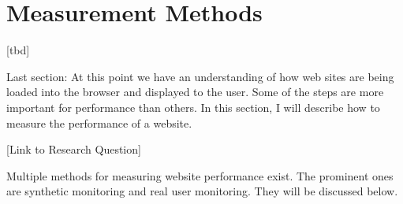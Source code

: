 







\section{Measurement Methods}


[tbd]


Last section: At this point we have an understanding of how web sites are being loaded into the browser and displayed to the user.
Some of the steps are more important for performance than others.
In this section, I will describe how to measure the performance of a website.


[Link to Research Question]




Multiple methods for measuring website performance exist.
The prominent ones are synthetic monitoring and real user monitoring.
They will be discussed below.

